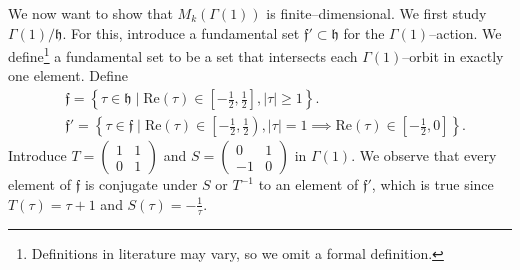 \documentclass{article}
\theoremstyle{definition}
\begin{document}
We now want to show that $M_k(\Gamma(1))$ is finite--dimensional. We first study $\Gamma(1)/\mathfrak{h}$. For this, introduce a fundamental set $\mathfrak{f}' \subset \mathfrak{h}$ for the $\Gamma(1)$--action. We define\footnote{Definitions in literature may vary, so we omit a formal definition.} a fundamental set to be a set that intersects each $\Gamma(1)$--orbit in exactly one element. Define 
\begin{align*}
    &\mathfrak{f} = \left\{\tau \in \mathfrak{h} \mid \text{Re}(\tau) \in \left[-\frac{1}{2},\frac{1}{2}\right], |\tau|\ge 1\right\}.\\
    &\mathfrak{f}' = \left\{\tau \in \mathfrak{f} \mid \text{Re}(\tau) \in \left[-\frac{1}{2},\frac{1}{2}\right), |\tau|=1 \implies \text{Re}(\tau) \in \left[-\frac{1}{2},0\right]\right\}.
\end{align*}
Introduce $T = \begin{pmatrix} 1&1\\0&1 \end{pmatrix}$ and $S = \begin{pmatrix} 0 & 1\\-1 & 0 \end{pmatrix}$ in $\Gamma(1)$. We observe that every element of $\mathfrak{f}$ is conjugate under $S$ or $T^{-1}$ to an element of $\mathfrak{f}'$, which is true since $T(\tau) = \tau + 1$ and $S(\tau) = -\frac{1}{\tau}$.
\end{document}
